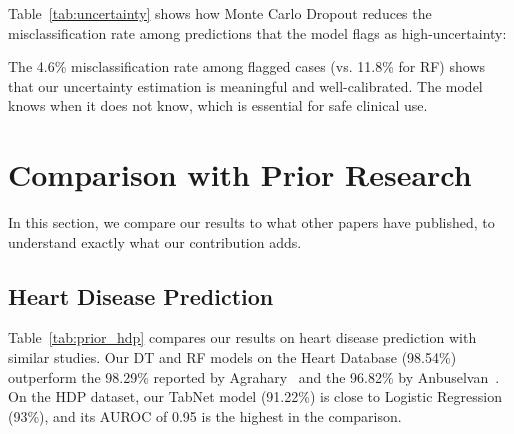 \documentclass[10pt, twocolumn]{article}
\begin{document}
Table~\ref{tab:uncertainty} shows how Monte Carlo Dropout reduces the misclassification rate
among predictions that the model flags as high-uncertainty:

\begin{table}[H]
\centering
\caption{Misclassification Rate Among High-Uncertainty Predictions.}
\label{tab:uncertainty}
\end{table}

The 4.6\% misclassification rate among flagged cases (vs. 11.8\% for RF) shows that our
uncertainty estimation is meaningful and well-calibrated. The model knows when it does not
know, which is essential for safe clinical use.

\section{Comparison with Prior Research}

In this section, we compare our results to what other papers have published, to understand
exactly what our contribution adds.

\subsection{Heart Disease Prediction}

Table~\ref{tab:prior_hdp} compares our results on heart disease prediction with similar studies.
Our DT and RF models on the Heart Database (98.54\%) outperform the 98.29\% reported by
Agrahary~\cite{agrahary2020} and the 96.82\% by Anbuselvan~\cite{anbuselvan2020}.
On the HDP dataset, our TabNet model (91.22\%) is close to Logistic Regression (93\%), and
its AUROC of 0.95 is the highest in the comparison.
\end{document}
